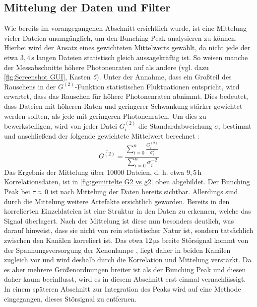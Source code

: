 \subsection{Mittelung der Daten und Filter}
\label{ssec:mittelung und filter}
Wie bereits im vorangegangenen Abschnitt ersichtlich wurde, ist eine Mittelung vieler Dateien unumgänglich, um den Bunching Peak analysieren zu können. 
Hierbei wird der Ansatz eines gewichteten Mittelwerts gewählt, da nicht jede der etwa $3{,}4\,\mathrm{s}$ langen Dateien statistisch gleich aussagekräftig ist. 
So weisen manche der Messabschnitte höhere Photonenraten auf als andere (vgl. dazu \autoref{fig:Screenshot GUI}, Kasten \emph{5}). 
Unter der Annahme, dass ein Großteil des Rauschens in der $G^{(2)}$-Funktion statistischen Fluktuationen entspricht, wird erwartet, dass das Rauschen für höhere Photonenraten abnimmt. 
Dies bedeutet, dass Dateien mit höheren Raten und geringerer Schwankung stärker gewichtet werden sollten, als jede mit geringeren Photonenraten. 
Um dies zu bewerkstelligen, wird von jeder Datei $G^{(2)}_i$ die Standardabweichung $\sigma_i$ bestimmt und anschließend der folgende gewichtete Mittelwert berechnet \cite{cochranProblemsArisingAnalysis1937}:
\begin{equation}
    \overline{G^{(2)}} = \frac{\sum_{i=0}^{n}\frac{G^{(2)}_i}{\sigma_i^2}}{\sum_{i=0}^{n} \sigma_i^{-2}}
\end{equation}
Das Ergebnis der Mittelung über 10000 Dateien, d. h. etwa $9{,}5$\,h Korrelationsdaten, ist in \autoref{fig:gemittelte G2 vs g2} oben abgebildet. 
Der Bunching Peak bei $\tau\approx 0$ ist nach Mittelung der Daten bereits sichtbar. 
Allerdings sind durch die Mittelung weitere Artefakte ersichtlich geworden. 
Bereits in den korrelierten Einzeldateien ist eine Struktur in den Daten zu erkennen, welche das Signal überlagert. 
Nach der Mittelung ist diese nun besonders deutlich, was darauf hinweist, dass sie nicht von rein statistischer Natur ist, sondern tatsächlich zwischen den Kanälen korreliert ist. 
Das etwa $12\,\mathrm{\mu s}$ breite Störsignal kommt von der Spannungsversorgung der Xenonlampe \cite{zmijaOpticalIntensityInterferometry2021}, liegt daher in beiden Kanälen zugleich vor und wird deshalb durch die Korrelation und Mittelung verstärkt. 
Da es aber mehrere Größenordnungen breiter ist als der Bunching Peak und diesen daher kaum beeinflusst, wird es in diesem Abschnitt erst einmal vernachlässigt. 
In einem späteren Abschnitt zur Integration des Peaks wird auf eine Methode eingegangen, dieses Störsignal zu entfernen. \\
